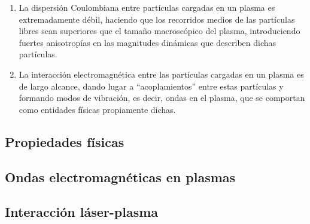 \begin{enumerate}[label=(\roman*)]

    \item La dispersión Coulombiana entre partículas cargadas en un plasma es extremadamente débil, haciendo que los recorridos medios de las partículas libres sean superiores que el tamaño macroscópico del plasma, introduciendo fuertes anisotropías en las magnitudes dinámicas que describen dichas partículas.

    \item La interacción electromagnética entre las partículas cargadas en un plasma es de largo alcance, dando lugar a \enquote{acoplamientos} entre estas partículas y formando modos de vibración, es decir, ondas en el plasma, que se comportan como entidades físicas propiamente dichas.

\end{enumerate}

\subsection{Propiedades físicas}\label{sec:1.2.1}

\subsection{Ondas electromagnéticas en plasmas}\label{sec:1.2.2}

\subsection{Interacción láser-plasma}\label{sec:1.2.3}

%
%
%
% 
%
%
